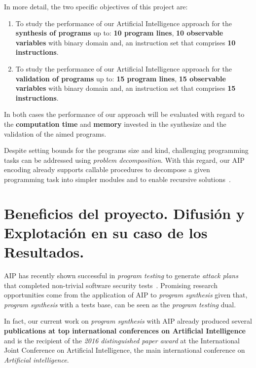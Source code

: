 \documentclass[10pt,a4paper]{paper}
\begin{document}
In more detail, the two specific objectives of this project are:
\begin{enumerate}
\item To study the performance of our Artificial Intelligence approach for the {\bf synthesis of programs} up to: {\bf 10 program lines}, {\bf 10 observable variables} with binary domain and, an instruction set that comprises {\bf 10 instructions}. 
\item To study the performance of our Artificial Intelligence approach for the {\bf validation of programs} up to: {\bf 15 program lines}, {\bf 15 observable variables} with binary domain and, an instruction set that comprises {\bf 15 instructions}. 
\end{enumerate}
In both cases the performance of our approach will be evaluated with regard to the {\bf computation time} and {\bf memory} invested in the synthesize and the validation of the aimed programs.

Despite setting bounds for the programs size and kind, challenging programming tasks can be addressed using {\em problem decomposition}. With this regard, our AIP encoding already supports callable procedures to decompose a given programming task into simpler modules and to enable recursive solutions~\cite{sergio:aprograming:icaps16,sergio:aprograming:ijcai16}.


\newpage
\section{Beneficios del proyecto. Difusión y Explotación en su caso de los Resultados.}
\label{subsec:beneficios}
AIP has recently shown successful in {\em program testing} to generate {\em attack plans} that completed non-trivial software security tests~\cite{hoffmann2015simulated,steinmetz2016revisiting,shmaryahu2016constructing,steinmetz2016goal}. Promising research opportunities come from the application of AIP to {\em program synthesis} given that, {\em program synthesis} with a tests base, can be seen as the {\em program testing} dual.

In fact, our current work on {\em program synthesis} with AIP already produced several {\bf publications at top international conferences on Artificial Intelligence}~\cite{segovia2017generating,sergio:aprogramingb:ijcai16,sergio:aprograming:ijcai16,sergio:aprograming:icaps16} and is the recipient of the {\it 2016 distinguished paper award} at the International Joint Conference on Artificial Intelligence, the main international conference on {\em Artificial intelligence}. 
\end{document}
